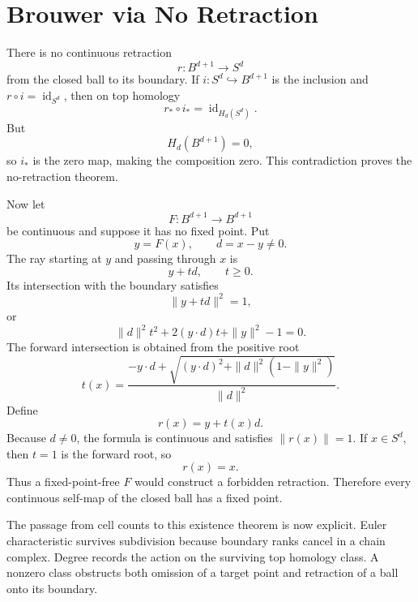 \section{Brouwer via No Retraction}

There is no continuous retraction
\[
  r:B^{d+1}\to S^d
\]
from the closed ball to its boundary.  If \(i:S^d\hookrightarrow B^{d+1}\) is the inclusion and \(r\circ i=\operatorname{id}_{S^d}\), then on top homology
\[
  r_*\circ i_*
  =\operatorname{id}_{H_d(S^d)}.
\]
But
\[
  H_d(B^{d+1})=0,
\]
so \(i_*\) is the zero map, making the composition zero.  This contradiction proves the no-retraction theorem.

Now let
\[
  F:B^{d+1}\to B^{d+1}
\]
be continuous and suppose it has no fixed point.  Put
\[
  y=F(x),
  \qquad
  d=x-y\ne0.
\]
The ray starting at \(y\) and passing through \(x\) is
\[
  y+t d,
  \qquad t\ge0.
\]
Its intersection with the boundary satisfies
\[
  \|y+td\|^2=1,
\]
or
\[
  \|d\|^2t^2+2(y\cdot d)t+\|y\|^2-1=0.
\]
The forward intersection is obtained from the positive root
\[
  t(x)=
  \frac{-y\cdot d+
  \sqrt{(y\cdot d)^2+\|d\|^2(1-\|y\|^2)}}
  {\|d\|^2}.
\]
Define
\[
  r(x)=y+t(x)d.
\]
Because \(d\ne0\), the formula is continuous and satisfies \(\|r(x)\|=1\).  If \(x\in S^d\), then \(t=1\) is the forward root, so
\[
  r(x)=x.
\]
Thus a fixed-point-free \(F\) would construct a forbidden retraction.  Therefore every continuous self-map of the closed ball has a fixed point.

The passage from cell counts to this existence theorem is now explicit.  Euler characteristic survives subdivision because boundary ranks cancel in a chain complex.  Degree records the action on the surviving top homology class.  A nonzero class obstructs both omission of a target point and retraction of a ball onto its boundary.